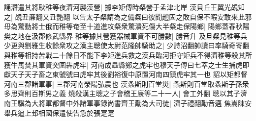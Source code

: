 誦潛遣其將耿稚等夜濟河襲漢營|{
	據李矩傳時粲營于孟津北岸}
漢貝丘王翼光覘知之|{
	覘丑亷翻又丑艶翻}
以告太子粲請為之備粲曰彼聞趙固之敗自保不暇安敢來此邪毋為驚動將士俄而稚等奄至十道進攻粲衆驚潰死傷大半粲走保陽鄉|{
	陽鄉蓋春秋陽樊之地在汲郡修武縣界}
稚等據其營獲器械軍資不可勝數|{
	勝音升}
及旦粲見稚等兵少更與劉雅生收餘衆攻之漢主聰使太尉范隆帥騎助之|{
	少詩沼翻帥讀曰率騎奇寄翻}
與稚等相持苦戰二十餘日不能下李矩進兵救之漢兵臨河拒守矩兵不得濟稚等殺其所獲牛馬焚其軍資突圍犇虎牢|{
	河南成臯縣鄭之虎牢也穆天子傳曰七萃之士生捕虎即獻天子天子畜之東虢號曰虎牢其後劉裕復中原置河南四鎮虎牢其一也}
詔以矩都督河南三郡諸軍事|{
	三郡河南滎陽弘農也}
漢螽斯則百堂災|{
	螽斯則百堂取螽斯子孫衆多思齊則百斯男之義}
燒殺漢主聰之子會稽王康等二十一人|{
	會工外翻}
聰以其子濟南王驥為大將軍都督中外諸軍事録尚書齊王勱為大司徒|{
	濟子禮翻勱音邁}
焦嵩陳安舉兵逼上邽相國保遣使告急於張寔寔

